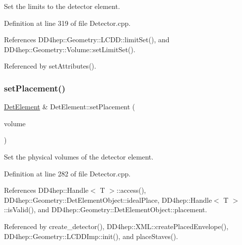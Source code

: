 Set the limits to the detector element. 



Definition at line 319 of file Detector.\+cpp.



References D\+D4hep\+::\+Geometry\+::\+L\+C\+D\+D\+::limit\+Set(), and D\+D4hep\+::\+Geometry\+::\+Volume\+::set\+Limit\+Set().



Referenced by set\+Attributes().

\hypertarget{class_d_d4hep_1_1_geometry_1_1_det_element_a18640f84168adced73afd4eb2b84a798}{}\label{class_d_d4hep_1_1_geometry_1_1_det_element_a18640f84168adced73afd4eb2b84a798} 
\subsubsection{\texorpdfstring{set\+Placement()}{setPlacement()}}
{\footnotesize\ttfamily \hyperlink{class_d_d4hep_1_1_geometry_1_1_det_element}{Det\+Element} \& Det\+Element\+::set\+Placement (\begin{DoxyParamCaption}\item[{const \hyperlink{class_d_d4hep_1_1_geometry_1_1_placed_volume}{Placed\+Volume} \&}]{volume }\end{DoxyParamCaption})}



Set the physical volumes of the detector element. 



Definition at line 282 of file Detector.\+cpp.



References D\+D4hep\+::\+Handle$<$ T $>$\+::access(), D\+D4hep\+::\+Geometry\+::\+Det\+Element\+Object\+::ideal\+Place, D\+D4hep\+::\+Handle$<$ T $>$\+::is\+Valid(), and D\+D4hep\+::\+Geometry\+::\+Det\+Element\+Object\+::placement.



Referenced by create\+\_\+detector(), D\+D4hep\+::\+X\+M\+L\+::create\+Placed\+Envelope(), D\+D4hep\+::\+Geometry\+::\+L\+C\+D\+D\+Imp\+::init(), and place\+Staves().

\hypertarget{class_d_d4hep_1_1_geometry_1_1_det_element_a8101bdf68474877825b169fff8b0f42a}{}\label{class_d_d4hep_1_1_geometry_1_1_det_element_a8101bdf68474877825b169fff8b0f42a} 
